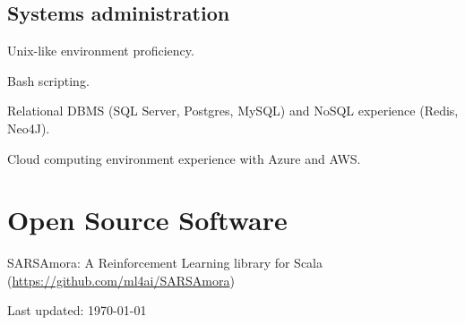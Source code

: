 \documentclass[letterpaper]{article}
\def\footerlink{http://jblevins.org/projects/cv-template/}
\renewenvironment{itemize}{
  \begin{list}{}{
    \setlength{\leftmargin}{1.5em}
  }
}{
  \end{list}
}
\begin{document}
\subsection*{Systems administration}
\begin{itemize}
	\item Unix-like environment proficiency.
	\item Bash scripting.
	\item Relational DBMS (SQL Server, Postgres, MySQL) and NoSQL experience (Redis, Neo4J).
	\item Cloud computing environment experience with Azure and AWS.
\end{itemize}

\section*{Open Source Software}
\begin{itemize}
	\item SARSAmora: A Reinforcement Learning library for Scala (\url{https://github.com/ml4ai/SARSAmora})
\end{itemize}
\bigskip

\begin{center}
  \begin{footnotesize}
    Last updated: \today \\
  \end{footnotesize}
\end{center}
\end{document}
